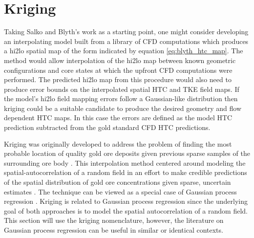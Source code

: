 \section{Kriging}

Taking Salko and Blyth's work as a starting point, one might consider developing an interpolating model built from a  library of CFD computations which produces a hi2lo spatial map of the form indicated by equation \ref{eq:blyth_htc_map}.  The method would allow interpolation of the hi2lo map between known geometric configurations and core states at which the upfront CFD computations were performed.  The predicted hi2lo map from this procedure would also need to produce error bounds on the interpolated spatial HTC and TKE field maps.  If the model's hi2lo field mapping errors follow a Gaussian-like distribution then kriging could be a suitable candidate to produce the desired geometry and flow dependent HTC maps.  In this case the errors are defined as the model HTC prediction subtracted from the gold standard CFD HTC predictions.

Kriging was originally developed to address the problem of finding the most probable location of quality gold ore deposits given previous sparse samples of the surrounding ore body \cite{krige51}.  This interpolation method centered around modeling the spatial-autocorrelation of a random field in an effort to make credible predictions of the spatial distribution of gold ore concentrations given sparse, uncertain estimates \cite{Krige51a}.   The technique can be viewed as a special case of Gaussian process regression \cite{Williams96}.  Kriging is related to Gaussian process regression since the underlying goal of both approaches is to model the spatial autocorrelation of a random field.  This section will use the kriging nomenclature, however, the literature on Gaussian process regression can be useful in similar or identical contexts.

